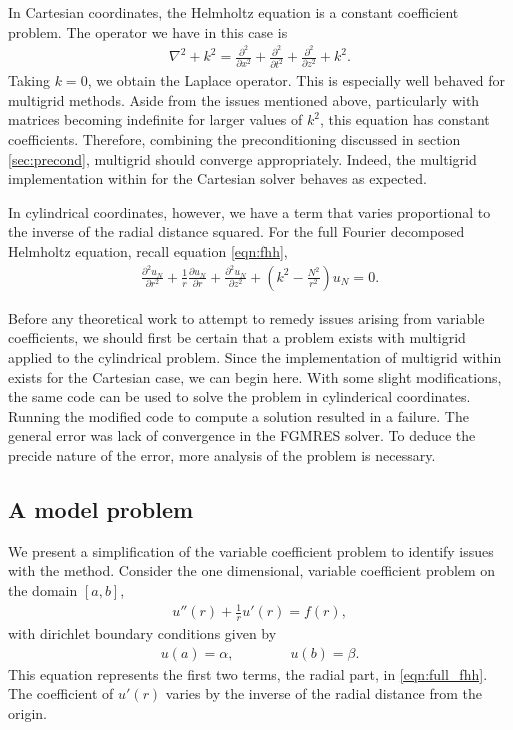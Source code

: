 In Cartesian coordinates, the Helmholtz equation is a constant coefficient problem.
The operator we have in this case is
\begin{align}
	\nabla^2 + k^2 = \frac{\partial^2}{\partial x^2} + \frac{\partial^2}{\partial t^2} + \frac{\partial^2}{\partial z^2} + k^2.
\end{align}
Taking $k=0$, we obtain the Laplace operator.
This is especially well behaved for multigrid methods.
Aside from the issues mentioned above, particularly with matrices becoming indefinite for larger values of $k^2$, this equation has constant coefficients.
Therefore, combining the preconditioning discussed in section \ref{sec:precond}, multigrid should converge appropriately.
Indeed, the multigrid implementation within \oomph for the Cartesian solver behaves as expected.

In cylindrical coordinates, however, we have a term that varies proportional to the inverse of the radial distance squared.
For the full Fourier decomposed Helmholtz equation, recall equation \eqref{eqn:fhh},
\begin{align}
	\frac{\partial^2 u_N}{\partial r^2}
			 + \frac{1}{r} \frac{\partial u_N}{\partial r}
			 + \frac{\partial^2 u_N}{\partial z^2}
			 + (k^2 - \frac{N^2}{r^2})u_N = 0. \label{eqn:full_fhh}
\end{align}

Before any theoretical work to attempt to remedy issues arising from variable coefficients, we should first be certain that a problem exists with multigrid applied to the cylindrical problem.
Since the implementation of multigrid within \oomph exists for the Cartesian case, we can begin here.
With some slight modifications, the same code can be used to solve the problem in cylinderical coordinates.
Running the modified code to compute a solution resulted in a failure.
The general error was lack of convergence in the FGMRES solver.
To deduce the precide nature of the error, more analysis of the problem is necessary.




\subsection{A model problem}


We present a simplification of the variable coefficient problem to identify issues with the method.
Consider the one dimensional, variable coefficient problem on the domain $\left[a,b\right]$,
\begin{align}
	u''(r) + \frac{1}{r}u'(r) = f(r), \label{eqn:model}
\end{align}
with dirichlet boundary conditions given by
\begin{align}
	u(a)=\alpha, \qquad \qquad u(b)=\beta.
\end{align}
This equation represents the first two terms, the radial part, in \eqref{eqn:full_fhh}.
The coefficient of $u'(r)$ varies by the inverse of the radial distance from the origin.

